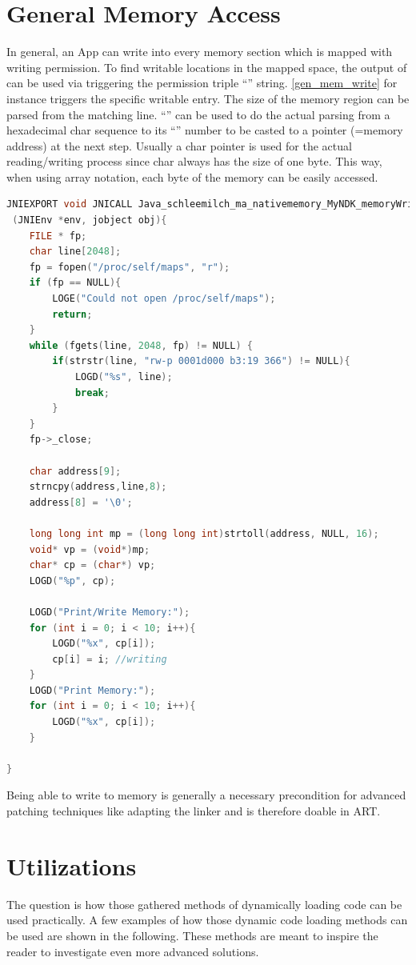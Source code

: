 \section{General Memory Access}\label{section:general_mem_access}
In general, an App can write into every memory section which is mapped with writing permission. To find writable locations in the mapped space, the output of  can be used via triggering the permission triple ``'' string. \autoref{gen_mem_write} for instance triggers the specific writable  entry. The size of the memory region can be parsed from the matching line. ``'' can be used to do the actual parsing from a
hexadecimal char sequence to its ``'' number to be casted to a pointer (=memory address) at the next step.
Usually a char pointer is used for the actual reading/writing process
since char always has the size of one byte. This way, when using array notation, each byte of the memory can be easily accessed.\newpage
\begin{lstlisting}[language=C++, caption=memoryWriting(), label=gen_mem_write]
JNIEXPORT void JNICALL Java_schleemilch_ma_nativememory_MyNDK_memoryWriting
 (JNIEnv *env, jobject obj){
    FILE * fp;
    char line[2048];
    fp = fopen("/proc/self/maps", "r");
    if (fp == NULL){
        LOGE("Could not open /proc/self/maps");
        return;
    }
    while (fgets(line, 2048, fp) != NULL) {
        if(strstr(line, "rw-p 0001d000 b3:19 366") != NULL){
            LOGD("%s", line);
            break;
        }
    }
    fp->_close;

    char address[9];
    strncpy(address,line,8);
    address[8] = '\0';

    long long int mp = (long long int)strtoll(address, NULL, 16);
    void* vp = (void*)mp;
    char* cp = (char*) vp;
    LOGD("%p", cp);

    LOGD("Print/Write Memory:");
    for (int i = 0; i < 10; i++){
        LOGD("%x", cp[i]);
        cp[i] = i; //writing
    }
    LOGD("Print Memory:");
    for (int i = 0; i < 10; i++){
        LOGD("%x", cp[i]);
    }

}
\end{lstlisting}
Being able to write to memory is generally a necessary precondition for advanced patching techniques like adapting the linker and is therefore doable in ART.

\section{Utilizations}
The question is how those gathered methods of dynamically loading code can be
used practically. A few examples of how those dynamic code loading methods can be used
are shown in the following. These methods are meant to inspire the reader to investigate even more advanced solutions.

